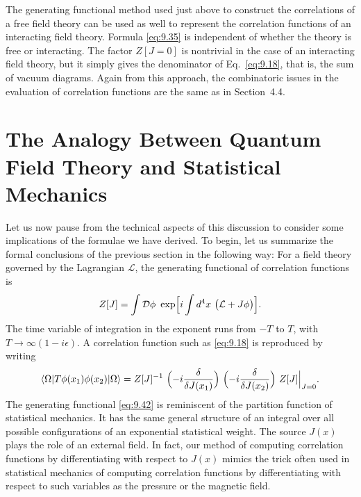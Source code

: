 The generating functional method used just above to construct the
correlations of a free field theory can be used as well to represent the
correlation functions of an interacting field theory.  Formula \eqref{eq:9.35}
is independent of whether the theory is free or interacting.  The factor
$Z[J=0]$ is nontrivial in the case of an interacting field theory, but it
simply gives the denominator of Eq.~\eqref{eq:9.18}, that is, the sum of
vacuum diagrams.  Again from this approach, the combinatoric issues in the
evaluation of correlation functions are the same as in Section~4.4.

\section{The Analogy Between Quantum Field Theory and Statistical Mechanics}

Let us now pause from the technical aspects of this discussion to consider some
implications of the formulae we have derived.  To begin, let us summarize the
formal conclusions of the previous section in the following way: For a field
theory governed by the Lagrangian $\mathcal{L}$, the generating functional of
correlation functions is
\begin{equation}
  Z[J] = \int \mathcal{D}\phi\ \exp\Bigl[ i\int d^4x\
    \bigl( \mathcal{L} + J\phi \bigr) \Bigr] .
  \label{eq:9.42}
\end{equation}
The time variable of integration in the exponent runs from $-T$ to $T$, with
$T\to\infty(1-i\epsilon)$.  A correlation function such as \eqref{eq:9.18} is
reproduced by writing
\begin{equation}
  \langle \Omega|T\phi(x_1)\phi(x_2)|\Omega\rangle
  = Z[J]^{-1}\ \Bigl( -i\frac{\delta}{\delta J(x_1)} \Bigr)\
    \Bigl( -i\frac{\delta}{\delta J(x_2)} \Bigr)\ Z[J]\Big|_{J=0} .
  \label{eq:9.43}
\end{equation}
The generating functional \eqref{eq:9.42} is reminiscent of the partition
function of statistical mechanics.  It has the same general structure of an
integral over all possible configurations of an exponential statistical weight.
The source $J(x)$ plays the role of an external field.  In fact, our method of
computing correlation functions by differentiating with respect to $J(x)$
mimics the trick often used in statistical mechanics of computing correlation
functions by differentiating with respect to such variables as the pressure or
the magnetic field.

